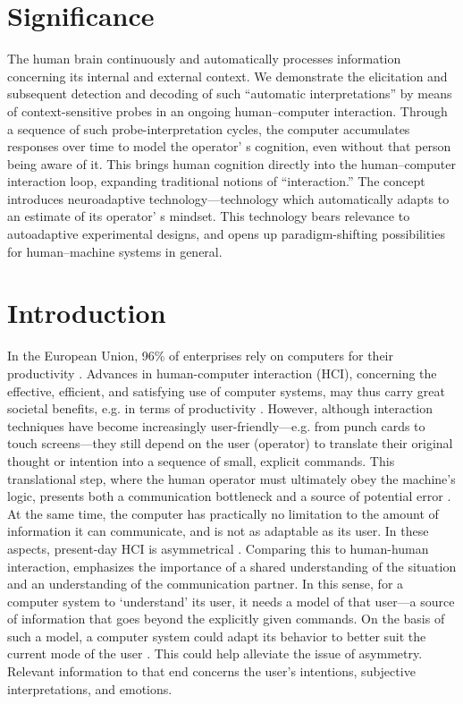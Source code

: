 \section{Significance}
The human brain continuously and automatically processes information concerning its internal and external context. We demonstrate the elicitation and subsequent detection and decoding of such ``automatic interpretations'' by means of context-sensitive probes in an ongoing human–computer interaction. Through a sequence of such probe-interpretation cycles, the computer accumulates responses over time to model the operator' s cognition, even without that person being aware of it. This brings human cognition directly into the human–computer interaction loop, expanding traditional notions of ``interaction.'' The concept introduces neuroadaptive technology---technology which automatically adapts to an estimate of its operator' s mindset. This technology bears relevance to autoadaptive experimental designs, and opens up paradigm-shifting possibilities for human–machine systems in general.


\section{Introduction}

In the European Union, 96\% of enterprises rely on computers for their productivity \cite{eurostatisoc_ci_eu_en2}. Advances in human-computer interaction (HCI), concerning the effective, efficient, and satisfying use of computer systems, may thus carry great societal benefits, e.g. in terms of productivity \cite{rogers2011}. However, although interaction techniques have become increasingly user-friendly---e.g. from punch cards to touch screens---they still depend on the user (operator) to translate their original thought or intention into a sequence of small, explicit commands. This translational step, where the human operator must ultimately obey the machine's logic, presents both a communication bottleneck and a source of potential error \cite{tufte1990}. At the same time, the computer has practically no limitation to the amount of information it can communicate, and is not as adaptable as its user. In these aspects, present-day HCI is asymmetrical \cite{suchman1987hmcproblems}. Comparing this to human-human interaction,  emphasizes the importance of a shared understanding of the situation and an understanding of the communication partner. In this sense, for a computer system to `understand' its user, it needs a model of that user---a source of information that goes beyond the explicitly given commands. On the basis of such a model, a computer system could adapt its behavior to better suit the current mode of the user \cite{fischer2001usermodeling}. This could help alleviate the issue of asymmetry. Relevant information to that end concerns the user's intentions, subjective interpretations, and emotions. 

